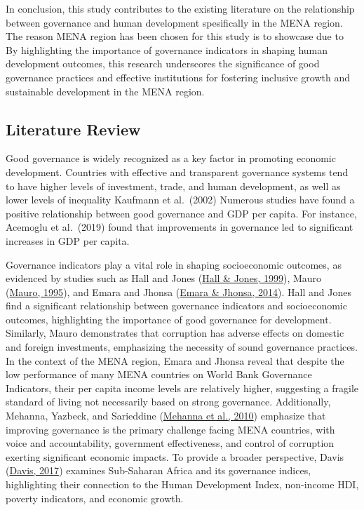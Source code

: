 \documentclass[
  12pt,
]{article}
\begin{document}
In conclusion, this study contributes to the existing literature on the
relationship between governance and human development spesifically in the MENA
region. The reason MENA region has been chosen for this study is to showcase due to\\
By highlighting the importance of governance indicators in
shaping human development outcomes, this research underscores the
significance of good governance practices and effective institutions for
fostering inclusive growth and sustainable development in the MENA
region.

\hypertarget{literature-review}{%
\subsection{Literature Review}\label{literature-review}}

Good governance is widely recognized as a key factor in promoting economic development.
Countries with effective and transparent governance systems tend to have higher levels of
investment, trade, and human development, as well as lower levels of inequality Kaufmann
et al.~(2002) Numerous studies have found a positive relationship between good governance
and GDP per capita. For instance, Acemoglu et al.~(2019) found that improvements in
governance led to significant increases in GDP per capita.

Governance indicators play a vital role in shaping socioeconomic outcomes, as evidenced by studies such as Hall and Jones (\protect\hyperlink{ref-hall1999}{Hall \& Jones, 1999}), Mauro (\protect\hyperlink{ref-mauro1995}{Mauro, 1995}), and Emara and Jhonsa (\protect\hyperlink{ref-emara2014}{Emara \& Jhonsa, 2014}). Hall and Jones find a significant relationship between governance indicators and socioeconomic outcomes, highlighting the importance of good governance for development. Similarly, Mauro demonstrates that corruption has adverse effects on domestic and foreign investments, emphasizing the necessity of sound governance practices. In the context of the MENA region, Emara and Jhonsa reveal that despite the low performance of many MENA countries on World Bank Governance Indicators, their per capita income levels are relatively higher, suggesting a fragile standard of living not necessarily based on strong governance. Additionally, Mehanna, Yazbeck, and Sarieddine (\protect\hyperlink{ref-mehanna2010}{Mehanna et al., 2010}) emphasize that improving governance is the primary challenge facing MENA countries, with voice and accountability, government effectiveness, and control of corruption exerting significant economic impacts. To provide a broader perspective, Davis (\protect\hyperlink{ref-davis2017}{Davis, 2017}) examines Sub-Saharan Africa and its governance indices, highlighting their connection to the Human Development Index, non-income HDI, poverty indicators, and economic growth.
\end{document}
